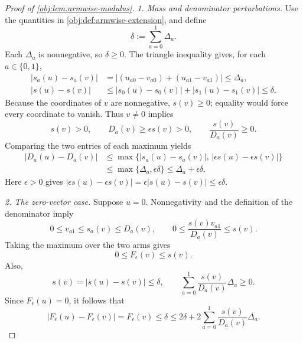 \documentclass[11pt]{article}
\begin{document}
\begin{proof}[Proof of \cref{obj:lem:armwise-modulus}]
\emph{1. Mass and denominator perturbations.}
Use the quantities in \cref{obj:def:armwise-extension}, and define
\[
\delta:=\sum_{a=0}^1\Delta_a.
\]
Each \(\Delta_a\) is nonnegative, so \(\delta\geq0\). The triangle inequality gives, for each \(a\in\{0,1\}\),
\[
\begin{aligned}
|s_a(u)-s_a(v)|
&=\bigl|(u_{a0}-v_{a0})+(u_{a1}-v_{a1})\bigr|
\leq\Delta_a,\\
|s(u)-s(v)|
&\leq |s_0(u)-s_0(v)|+|s_1(u)-s_1(v)|
\leq\delta.
\end{aligned}
\]
Because the coordinates of \(v\) are nonnegative, \(s(v)\geq0\); equality would force every coordinate to vanish. Thus \(v\neq0\) implies
\[
s(v)>0,\qquad
D_a(v)\geq\epsilon s(v)>0,\qquad
\frac{s(v)}{D_a(v)}\geq0.
\]
Comparing the two entries of each maximum yields
\[
\begin{aligned}
|D_a(u)-D_a(v)|
&\leq
\max\bigl\{|s_a(u)-s_a(v)|,\,
          |\epsilon s(u)-\epsilon s(v)|\bigr\}\\
&\leq\max\{\Delta_a,\epsilon\delta\}
\leq\Delta_a+\epsilon\delta.
\end{aligned}
\]
Here \(\epsilon>0\) gives
\(
|\epsilon s(u)-\epsilon s(v)|
=\epsilon|s(u)-s(v)|\leq\epsilon\delta
\).

\emph{2. The zero-vector case.}
Suppose \(u=0\). Nonnegativity and the definition of the denominator imply
\[
0\leq v_{a1}\leq s_a(v)\leq D_a(v),
\qquad
0\leq\frac{s(v)v_{a1}}{D_a(v)}\leq s(v).
\]
Taking the maximum over the two arms gives
\[
0\leq F_\epsilon(v)\leq s(v).
\]
Also,
\[
s(v)=|s(u)-s(v)|\leq\delta,
\qquad
\sum_{a=0}^1\frac{s(v)}{D_a(v)}\Delta_a\geq0.
\]
Since \(F_\epsilon(u)=0\), it follows that
\[
|F_\epsilon(u)-F_\epsilon(v)|
=F_\epsilon(v)
\leq\delta
\leq2\delta+
2\sum_{a=0}^1\frac{s(v)}{D_a(v)}\Delta_a.
\]


\end{proof}
\end{document}
